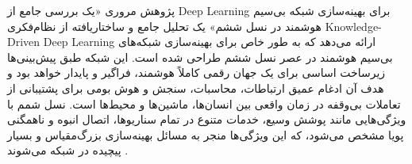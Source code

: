 \begin{comment}
c
​
) از ماتریس بازیابی‌شده‌ی مرحله اول است . این تجزیه به تنهایی منجر به کاهش قابل توجه زمان اجرا (۸۳ درصد کاهش در مقایسه با بازیابی مشترک CS با یک شبکه‌ی LAMP) و بهبود دقت تخمین می‌شود .
برای کاهش بیشتر پیچیدگی در مرحله دوم، یک مکانیزم فشرده‌سازی ردیفی (Row Compression Mechanism) بر اساس پراکندگی ساختاریافته‌ی ردیفی کانال آبشاری زاویه‌ای ارائه شده است . این مکانیزم، ردیف‌هایی از ماتریس H 
row
​
را که دارای توان کمتری هستند (بر اساس میانگین نرم l 
2
​
ردیف‌ها به عنوان آستانه پویا)، فیلتر می‌کند . با نادیده گرفتن این ردیف‌های کم‌توان که عمدتاً ناشی از نویز باقیمانده هستند، RCTS-LAMP پیچیدگی محاسباتی مرحله دوم را کاهش داده و از ۴۰ تا ۴۷ درصد کاهش بیشتر در زمان اجرا، بدون افت عملکرد، بهره‌مند می‌شود .
همچنین، نویسندگان یک نسخه تقویت‌شده به نام RCTS-LAMP-MMV را معرفی می‌کنند که در مرحله اول بازیابی ماتریس پراکنده‌ی ردیفی، از یک تابع آستانه‌سازی برداری یادگرفته شده (learned vector shrinkage function) برای بهره‌برداری از پراکندگی مشترک بین ستون‌های ماتریس (به عنوان یک مسئله MMV) استفاده می‌کند. این کار به بهبود بیشتر عملکرد تخمین کانال آبشاری می‌انجامد .
برای حل مسئله تخمین مشترک کانال مستقیم و آبشاری بدون نیاز به شبکه‌ی اضافی، نویسندگان یک رویه آموزشی سه‌مرحله‌ای را پیشنهاد می‌کنند که از یادگیری انتقالی (transfer learning) بهره می‌برد . شبکه‌ی LAMP مرحله اول که برای بازیابی سیگنال پراکنده‌ی ردیفی آموزش دیده است، برای بازیابی کانال مستقیم زاویه‌ای پراکنده ( 
h
~

d
​
) نیز به کار گرفته می‌شود . در مرحله‌ی نهایی، شبکه‌ها به‌طور مشترک برای تخمین کانال آبشاری تحت تأثیر خطای تخمین کانال مستقیم، بهینه‌سازی می‌شوند . نتایج شبیه‌سازی نشان می‌دهد که RCTS-LAMP به دلیل کمترین زمان اجرا و عملکرد تخمین قوی، بهترین تعادل بین پیچیدگی محاسباتی و دقت را در مقایسه با سایر روش‌های خط مبنای مدل-محور از جمله TRICE-OMP و LAMP ارائه می‌دهد
\cite{DeepUnfoldingBased}.
\end{comment}
پژوهش مروری «یک بررسی جامع از 
\gls{Deep Learning}
برای بهینه‌سازی شبکه بی‌سیم هوشمند در نسل ششم» یک تحلیل جامع و ساختاریافته از نظام‌فکری 
\gls{Knowledge-Driven Deep Learning}
ارائه می‌دهد که به طور خاص برای بهینه‌سازی شبکه‌های بی‌سیم هوشمند در عصر نسل ششم طراحی شده است. این شبکه طبق پیش‌بینی‌ها زیرساخت اساسی برای یک جهان رقمی کاملاً هوشمند، فراگیر و پایدار خواهد بود و هدف آن ادغام عمیق ارتباطات، محاسبات، سنجش و هوش بومی برای پشتیبانی از تعاملات بی‌وقفه در زمان واقعی بین انسان‌ها، ماشین‌ها و محیط‌ها است. نسل شمم با ویژگی‌هایی مانند پوشش وسیع، خدمات متنوع در تمام سناریوها، اتصال انبوه و ناهمگنی پویا مشخص می‌شود، که این ویژگی‌ها منجر به مسائل بهینه‌سازی بزرگ‌مقیاس و بسیار پیچیده در شبکه می‌شوند .

